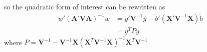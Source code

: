 \documentclass[12pt]{article}
\begin{document}
    so the quadratic form of interest can be rewritten as
    \begin{equation*}
    \begin{split}
        w'(\mathbf{A}'\mathbf{V}\mathbf{A})^{-1}w&=y'\mathbf{V}^{-1}y-\tilde{b}'(\mathbf{X}'\mathbf{V}^{-1}\mathbf{X})\tilde{b}\\
        &=y^TPy
    \end{split}
    \end{equation*}
    where $P=\mathbf{V}^{-1}-\mathbf{V}^{-1}\mathbf{X}(\mathbf{X}^T\mathbf{V}^{-1}\mathbf{X})^{-1}\mathbf{X}^T\mathbf{V}^{-1}$
\end{document}
